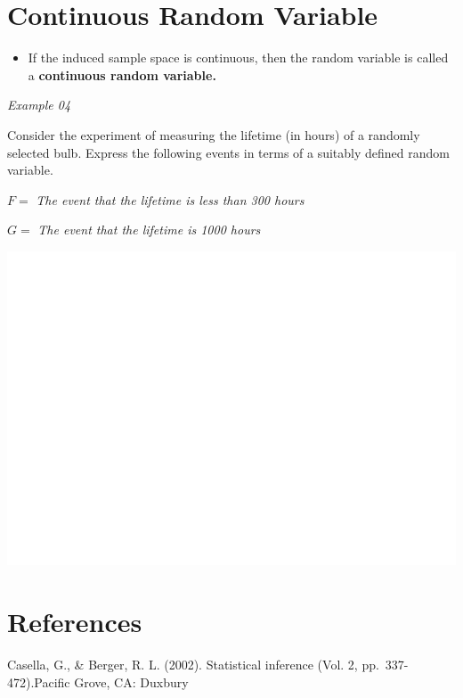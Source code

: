 \documentclass[]{book}
\providecommand{\tightlist}{%
  \setlength{\itemsep}{0pt}\setlength{\parskip}{0pt}}
\begin{document}
\hypertarget{continuous-random-variable}{%
\section{Continuous Random Variable}\label{continuous-random-variable}}

\begin{itemize}
\tightlist
\item
  If the induced sample space is continuous, then the random variable is called a \textbf{continuous random variable.}
\end{itemize}

\emph{Example 04}

Consider the experiment of measuring the lifetime (in hours) of a randomly selected bulb. Express the following events in terms of a suitably defined random variable.

\(F=\) \emph{The event that the lifetime is less than 300 hours}

\(G=\) \emph{The event that the lifetime is 1000 hours}

\begin{center}\includegraphics[width=1\linewidth]{figure/Ch1box4-1} \end{center}

\hypertarget{references-7}{%
\section*{References}\label{references-7}}

Casella, G., \& Berger, R. L. (2002). Statistical inference (Vol. 2, pp.~337-472).Pacific Grove, CA: Duxbury
\end{document}
